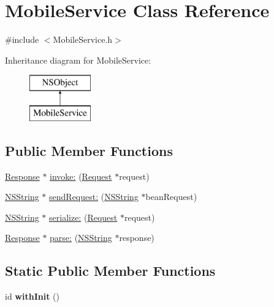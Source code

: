 \hypertarget{interface_mobile_service}{
\section{\-Mobile\-Service \-Class \-Reference}
\label{interface_mobile_service}
}


{\ttfamily \#include $<$\-Mobile\-Service.\-h$>$}

\-Inheritance diagram for \-Mobile\-Service\-:\begin{figure}[H]
\begin{center}
\leavevmode
\includegraphics[height=2.000000cm]{interface_mobile_service}
\end{center}
\end{figure}
\subsection*{\-Public \-Member \-Functions}
\begin{DoxyCompactItemize}
\item 
\hyperlink{interface_response}{\-Response} $\ast$ \hyperlink{interface_mobile_service_afccab06a27685cd5b856c08a8bebb463}{invoke\-:} (\hyperlink{interface_request}{\-Request} $\ast$request)
\item 
\hyperlink{class_n_s_string}{\-N\-S\-String} $\ast$ \hyperlink{interface_mobile_service_a07b800377937e7f5a0f3604f0f78a6c1}{send\-Request\-:} (\hyperlink{class_n_s_string}{\-N\-S\-String} $\ast$bean\-Request)
\item 
\hyperlink{class_n_s_string}{\-N\-S\-String} $\ast$ \hyperlink{interface_mobile_service_a52f0671f42c9430cfffbf644fee32858}{serialize\-:} (\hyperlink{interface_request}{\-Request} $\ast$request)
\item 
\hyperlink{interface_response}{\-Response} $\ast$ \hyperlink{interface_mobile_service_a3037792535d9bf043b1bb285e086586d}{parse\-:} (\hyperlink{class_n_s_string}{\-N\-S\-String} $\ast$response)
\end{DoxyCompactItemize}
\subsection*{\-Static \-Public \-Member \-Functions}
\begin{DoxyCompactItemize}
\item 
\hypertarget{interface_mobile_service_a29618cda82256009388da0e28084a8f8}{
id {\bfseries with\-Init} ()}
\label{interface_mobile_service_a29618cda82256009388da0e28084a8f8}

\end{DoxyCompactItemize}


